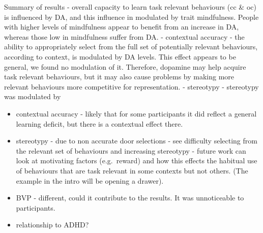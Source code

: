 \documentclass{article}
\begin{document}
Summary of results - overall capacity to learn task relevant behaviours
(cc \& oc) is influenced by DA, and this influence in modulated by trait
mindfulness. People with higher levels of mindfulness appear to benefit
from an increase in DA, whereas those low in mindfulness suffer from DA.
- contextual accuracy - the ability to appropriately select from the
full set of potentially relevant behaviours, according to context, is
modulated by DA levels. This effect appears to be general, we found no
modulation of it. Therefore, dopamine may help acquire task relevant
behaviours, but it may also cause problems by making more relevant
behaviours more competitive for representation. - stereotypy -
stereotypy was modulated by

\begin{itemize}
\item
  contextual accuracy - likely that for some participants it did reflect
  a general learning deficit, but there is a contextual effect there.
\item
  stereotypy - due to non accurate door selections - see difficulty
  selecting from the relevant set of behaviours and increasing
  stereotypy - future work can look at motivating factors (e.g.~reward)
  and how this effects the habitual use of behaviours that are task
  relevant in some contexts but not others. (The example in the intro
  will be opening a drawer).
\item
  BVP - different, could it contribute to the results. It was
  unnoticeable to participants.
\item
  relationship to ADHD?
\end{itemize}



\end{document}
